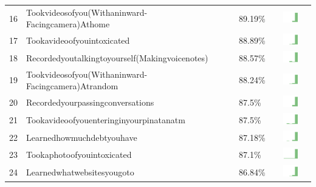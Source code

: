 \documentclass[a4paper,12pt]{article}
\begin{document}
\begin{longtable}{| p{0.5cm} | p{7cm} | p{1cm} | c |}
16 & Tookvideosofyou(Withaninward-Facingcamera)Athome & 89.19\% & \includegraphics[width = 2cm, height = 0.5cm]{tookvideosofyou(withaninward-facingcamera)athomeWORKCONTACTS} \\  
17 & Tookavideoofyouintoxicated & 88.89\% & \includegraphics[width = 2cm, height = 0.5cm]{tookavideoofyouintoxicatedWORKCONTACTS} \\  
18 & Recordedyoutalkingtoyourself(Makingvoicenotes) & 88.57\% & \includegraphics[width = 2cm, height = 0.5cm]{recordedyoutalkingtoyourself(makingvoicenotes)WORKCONTACTS} \\  
19 & Tookvideosofyou(Withaninward-Facingcamera)Atrandom & 88.24\% & \includegraphics[width = 2cm, height = 0.5cm]{tookvideosofyou(withaninward-facingcamera)atrandomWORKCONTACTS} \\  
20 & Recordedyourpassingconversations & 87.5\% & \includegraphics[width = 2cm, height = 0.5cm]{recordedyourpassingconversationsWORKCONTACTS} \\  
21 & Tookavideoofyouenteringinyourpinatanatm & 87.5\% & \includegraphics[width = 2cm, height = 0.5cm]{tookavideoofyouenteringinyourPINatanATMWORKCONTACTS} \\  
22 & Learnedhowmuchdebtyouhave & 87.18\% & \includegraphics[width = 2cm, height = 0.5cm]{learnedhowmuchdebtyouhaveWORKCONTACTS} \\  
23 & Tookaphotoofyouintoxicated & 87.1\% & \includegraphics[width = 2cm, height = 0.5cm]{tookaphotoofyouintoxicatedWORKCONTACTS} \\  
24 & Learnedwhatwebsitesyougoto & 86.84\% & \includegraphics[width = 2cm, height = 0.5cm]{learnedwhatwebsitesyougotoWORKCONTACTS} \\  

\end{longtable}
\end{document}
